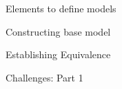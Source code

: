 \documentclass[notes, xcolor = dvipsnames]{beamer}
\begin{document}
    \begin{frame}{Elements to define models} 


    \end{frame}

    \begin{frame}{Constructing base model}


    \end{frame}

    \begin{frame}{Establishing Equivalence} 


    \end{frame}


    \begin{frame}{Challenges: Part 1}




 
    \end{frame}
    
\end{document}
